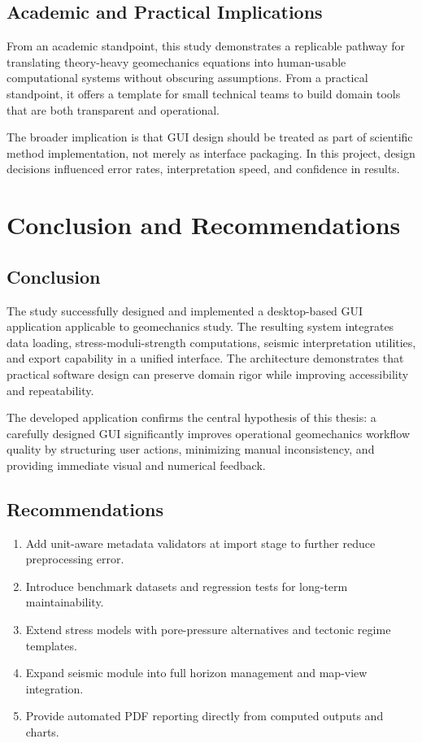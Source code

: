\documentclass[12pt,a4paper]{report}
\begin{document}
\section{Academic and Practical Implications}
From an academic standpoint, this study demonstrates a replicable pathway for translating theory-heavy geomechanics equations into human-usable computational systems without obscuring assumptions. From a practical standpoint, it offers a template for small technical teams to build domain tools that are both transparent and operational.

The broader implication is that GUI design should be treated as part of scientific method implementation, not merely as interface packaging. In this project, design decisions influenced error rates, interpretation speed, and confidence in results.

\chapter{Conclusion and Recommendations}
\section{Conclusion}
The study successfully designed and implemented a desktop-based GUI application applicable to geomechanics study. The resulting system integrates data loading, stress-moduli-strength computations, seismic interpretation utilities, and export capability in a unified interface. The architecture demonstrates that practical software design can preserve domain rigor while improving accessibility and repeatability.

The developed application confirms the central hypothesis of this thesis: a carefully designed GUI significantly improves operational geomechanics workflow quality by structuring user actions, minimizing manual inconsistency, and providing immediate visual and numerical feedback.

\section{Recommendations}
\begin{enumerate}
    \item Add unit-aware metadata validators at import stage to further reduce preprocessing error.
    \item Introduce benchmark datasets and regression tests for long-term maintainability.
    \item Extend stress models with pore-pressure alternatives and tectonic regime templates.
    \item Expand seismic module into full horizon management and map-view integration.
    \item Provide automated PDF reporting directly from computed outputs and charts.
\end{enumerate}
\end{document}
